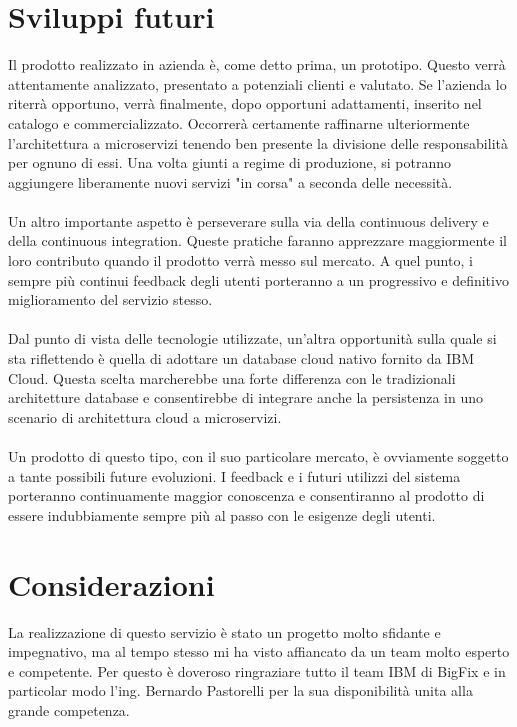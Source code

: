 \section{Sviluppi futuri}
Il prodotto realizzato in azienda è, come detto prima, un prototipo. Questo verrà attentamente analizzato, presentato a potenziali clienti e valutato. Se l'azienda lo riterrà opportuno, verrà finalmente, dopo opportuni adattamenti, inserito nel catalogo e commercializzato. Occorrerà certamente raffinarne ulteriormente l'architettura a microservizi tenendo ben presente la divisione delle responsabilità per ognuno di essi. Una volta giunti a regime di produzione, si potranno aggiungere liberamente nuovi servizi "in corsa" a seconda delle necessità.
\paragraph{}
Un altro importante aspetto è perseverare sulla via della continuous delivery e della continuous integration. Queste pratiche faranno apprezzare maggiormente il loro contributo quando il prodotto verrà messo sul mercato. A quel punto, i sempre più continui feedback degli utenti porteranno a un progressivo e definitivo miglioramento del servizio stesso.
\paragraph{}
Dal punto di vista delle tecnologie utilizzate, un'altra opportunità sulla quale si sta riflettendo è quella di adottare un database cloud nativo fornito da IBM Cloud. Questa scelta marcherebbe una forte differenza con le tradizionali architetture database e consentirebbe di integrare anche la persistenza in uno scenario di architettura cloud a microservizi.
\paragraph{}
Un prodotto di questo tipo, con il suo particolare mercato, è ovviamente soggetto a tante possibili future evoluzioni. I feedback e i futuri utilizzi del sistema porteranno continuamente maggior conoscenza e consentiranno al prodotto di essere indubbiamente sempre più al passo con le esigenze degli utenti.

\section{Considerazioni}
La realizzazione di questo servizio è stato un progetto molto sfidante e impegnativo, ma al tempo stesso mi ha visto affiancato da un team molto esperto e competente. Per questo è doveroso ringraziare tutto il team IBM di BigFix e in particolar modo l'ing. Bernardo Pastorelli per la sua disponibilità unita alla grande competenza. 

